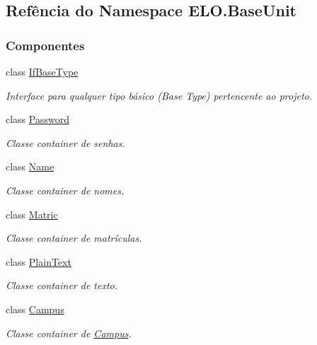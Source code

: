 \hypertarget{namespaceELO_1_1BaseUnit}{\subsection{Refência do Namespace E\-L\-O.\-Base\-Unit}
\label{namespaceELO_1_1BaseUnit}
}
\subsubsection*{Componentes}
\begin{DoxyCompactItemize}
\item 
class \hyperlink{classELO_1_1BaseUnit_1_1IfBaseType}{If\-Base\-Type}
\begin{DoxyCompactList}\small\item\em Interface para qualquer tipo básico (Base Type) pertencente ao projeto. \end{DoxyCompactList}\item 
class \hyperlink{classELO_1_1BaseUnit_1_1Password}{Password}
\begin{DoxyCompactList}\small\item\em Classe container de senhas. \end{DoxyCompactList}\item 
class \hyperlink{classELO_1_1BaseUnit_1_1Name}{Name}
\begin{DoxyCompactList}\small\item\em Classe container de nomes. \end{DoxyCompactList}\item 
class \hyperlink{classELO_1_1BaseUnit_1_1Matric}{Matric}
\begin{DoxyCompactList}\small\item\em Classe container de matrículas. \end{DoxyCompactList}\item 
class \hyperlink{classELO_1_1BaseUnit_1_1PlainText}{Plain\-Text}
\begin{DoxyCompactList}\small\item\em Classe container de texto. \end{DoxyCompactList}\item 
class \hyperlink{classELO_1_1BaseUnit_1_1Campus}{Campus}
\begin{DoxyCompactList}\small\item\em Classe container de \hyperlink{classELO_1_1BaseUnit_1_1Campus}{Campus}. \end{DoxyCompactList}\item 

\end{DoxyCompactItemize}
